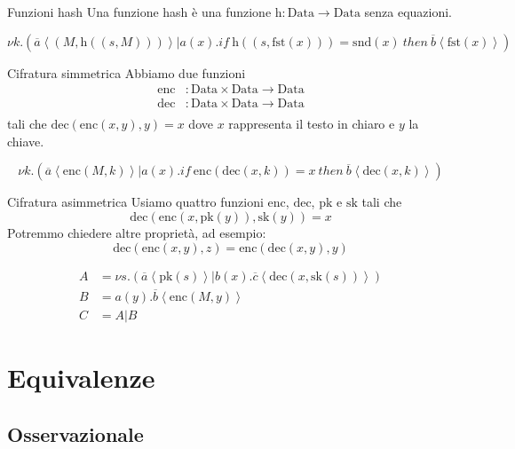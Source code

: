 \documentclass{beamer}
\theoremstyle{plain}
\theoremstyle{definition}
\theoremstyle{remark}
\newcommand{\obar}[1]{\overline{#1}}
\newcommand{\pa}[1]{\left(#1\right)}
\newcommand{\ang}[1]{\left<#1\right>}
\begin{document}
\begin{frame}{Funzioni hash}
  Una funzione hash \`e una funzione $\mathrm{h}: \mathrm{Data}
  \rightarrow \mathrm{Data}$ senza equazioni.
  
  \[ \nu k.\pa{ \obar{a}\ang{ \pa{M,\mathrm{h}\pa{(s,M)}}} | a(x).if\
      \mathrm{h}\pa{(s,\mathrm{fst}(x))} = \mathrm{snd}(x)\ then\
      \obar{b}\ang{\mathrm{fst}(x)}} \]
\end{frame}

\begin{frame}{Cifratura simmetrica}
  Abbiamo due funzioni
  \begin{align*}
    \mathrm{enc} &: \mathrm{Data} \times \mathrm{Data} \rightarrow
                   \mathrm{Data} \\
    \mathrm{dec} &: \mathrm{Data} \times \mathrm{Data} \rightarrow
                   \mathrm{Data} \\
  \end{align*}
  tali che $\mathrm{dec}\pa{\mathrm{enc}(x,y),y} = x$ dove $x$
  rappresenta il testo in chiaro e $y$ la chiave.
  \vfill
  
  \[ \nu k. \pa{ \obar{a}\ang{\mathrm{enc}(M,k)} | a\pa{x}.if\
      \mathrm{enc}\pa{ \mathrm{dec}(x,k)} = x\ then\
      \obar{b}\ang{\mathrm{dec}(x,k)}} \]
\end{frame}

\begin{frame}{Cifratura asimmetrica}
  Usiamo quattro funzioni $\mathrm{enc}$, $\mathrm{dec}$,
  $\mathrm{pk}$ e $\mathrm{sk}$ tali che
  \[ \mathrm{dec}\pa{\mathrm{enc}\pa{x,\mathrm{pk}(y)},\mathrm{sk}(y)}
    = x \]
  Potremmo chiedere altre propriet\`a, ad esempio:
  \[ \mathrm{dec}\pa{\mathrm{enc}(x,y),z} =
    \mathrm{enc}\pa{\mathrm{dec}(x,y),y} \]
  \vfill

  \begin{align*}
    A &= \nu s.\pa{ \obar{a}\ang{\mathrm{pk}(s)}|
    b(x).\obar{c}\ang{\mathrm{dec}\pa{ x,\mathrm{sk}(s) } } } \\
    B &= a(y).\obar{b}\ang{\mathrm{enc}(M,y)} \\
    C &= A|B   
  \end{align*}
\end{frame}

\section{Equivalenze}

\subsection{Osservazionale}
\end{document}
